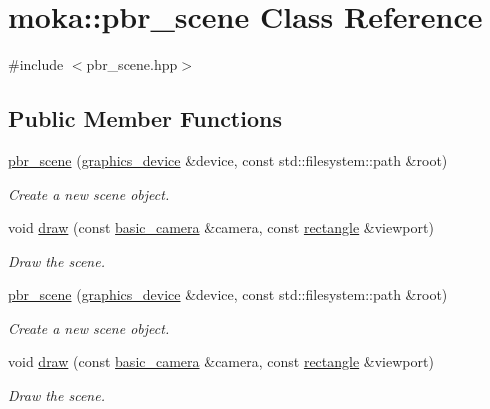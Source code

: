 \hypertarget{classmoka_1_1pbr__scene}{}\section{moka\+::pbr\+\_\+scene Class Reference}
\label{classmoka_1_1pbr__scene}


{\ttfamily \#include $<$pbr\+\_\+scene.\+hpp$>$}

\subsection*{Public Member Functions}
\begin{DoxyCompactItemize}
\item 
\mbox{\hyperlink{classmoka_1_1pbr__scene_a6a5516f94cf0297f838aa3b819216fe9}{pbr\+\_\+scene}} (\mbox{\hyperlink{classmoka_1_1graphics__device}{graphics\+\_\+device}} \&device, const std\+::filesystem\+::path \&root)
\begin{DoxyCompactList}\small\item\em Create a new scene object. \end{DoxyCompactList}\item 
void \mbox{\hyperlink{classmoka_1_1pbr__scene_a520722e6fd897bd9d35cd5c1b6eb14b6}{draw}} (const \mbox{\hyperlink{classmoka_1_1basic__camera}{basic\+\_\+camera}} \&camera, const \mbox{\hyperlink{namespacemoka_ab5e90635f0a0441cc99f2328bc34500d}{rectangle}} \&viewport)
\begin{DoxyCompactList}\small\item\em Draw the scene. \end{DoxyCompactList}\item 
\mbox{\hyperlink{classmoka_1_1pbr__scene_a6a5516f94cf0297f838aa3b819216fe9}{pbr\+\_\+scene}} (\mbox{\hyperlink{classmoka_1_1graphics__device}{graphics\+\_\+device}} \&device, const std\+::filesystem\+::path \&root)
\begin{DoxyCompactList}\small\item\em Create a new scene object. \end{DoxyCompactList}\item 
void \mbox{\hyperlink{classmoka_1_1pbr__scene_a520722e6fd897bd9d35cd5c1b6eb14b6}{draw}} (const \mbox{\hyperlink{classmoka_1_1basic__camera}{basic\+\_\+camera}} \&camera, const \mbox{\hyperlink{namespacemoka_ab5e90635f0a0441cc99f2328bc34500d}{rectangle}} \&viewport)
\begin{DoxyCompactList}\small\item\em Draw the scene. \end{DoxyCompactList}\end{DoxyCompactItemize}
